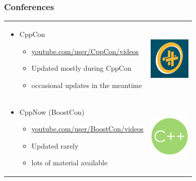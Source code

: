 \documentclass{beamer}
\begin{document}
\begin{frame}
\frametitle{Conferences}
{\centering
\begin{tabular}{m{8.5cm} m{2cm}}
\begin{itemize}
  \item CppCon
  \begin{itemize}
    \item \href{https://www.youtube.com/user/CppCon/videos}{youtube.com/user/CppCon/videos}
    \item Updated mostly during CppCon
    \item occasional updates in the meantime
  \end{itemize}
\end{itemize} &
\includegraphics[width=2cm]{pics/conf_cppcon.jpg} \\

\begin{itemize}
  \item CppNow (BoostCon)
  \begin{itemize}
    \item \href{https://www.youtube.com/user/BoostCon/videos}{youtube.com/user/BoostCon/videos}
    \item Updated rarely
    \item lots of material available
  \end{itemize}
\end{itemize} &
\includegraphics[width=2cm]{pics/conf_boostcon.jpg} \\
\end{tabular}
}
\end{frame}
\end{document}
